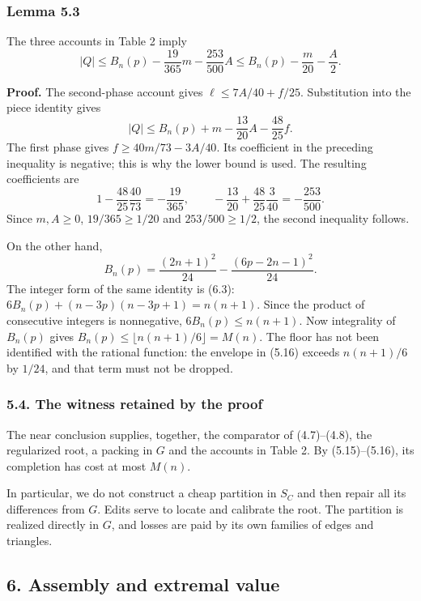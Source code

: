 \documentclass[english,11pt,a4paper]{article}
\begin{document}
\subsubsection{Lemma 5.3}\label{lemma-5.3}

The three accounts in Table 2 imply \[
|Q|\le B_n(p)-\frac{19}{365}m-\frac{253}{500}A
\le B_n(p)-\frac m{20}-\frac A2.
\tag{5.15}
\]

\textbf{Proof.} The second-phase account gives \(\ell\le7A/40+f/25\). Substitution into the piece identity gives \[
|Q|\le B_n(p)+m-\frac{13}{20}A-\frac{48}{25}f.
\] The first phase gives \(f\ge40m/73-3A/40\). Its coefficient in the preceding inequality is negative; this is why the lower bound is used. The resulting coefficients are \[
1-\frac{48}{25}\frac{40}{73}=-\frac{19}{365},\qquad
-\frac{13}{20}+\frac{48}{25}\frac3{40}=-\frac{253}{500}.
\] Since \(m,A\ge0\), \(19/365\ge1/20\) and \(253/500\ge1/2\), the second inequality follows.

On the other hand, \[
B_n(p)=\frac{(2n+1)^2}{24}-\frac{(6p-2n-1)^2}{24}.
\tag{5.16}
\] The integer form of the same identity is (6.3): \(6B_n(p)+(n-3p)(n-3p+1)=n(n+1)\). Since the product of consecutive integers is nonnegative, \(6B_n(p)\le n(n+1)\). Now integrality of \(B_n(p)\) gives \(B_n(p)\le\lfloor n(n+1)/6\rfloor=M(n)\). The floor has not been identified with the rational function: the envelope in (5.16) exceeds \(n(n+1)/6\) by \(1/24\), and that term must not be dropped.

\subsubsection{5.4. The witness retained by the proof}\label{the-witness-retained-by-the-proof}

The near conclusion supplies, together, the comparator of (4.7)--(4.8), the regularized root, a packing in \(G\) and the accounts in Table 2. By (5.15)--(5.16), its completion has cost at most \(M(n)\).

In particular, we do not construct a cheap partition in \(S_C\) and then repair all its differences from \(G\). Edits serve to locate and calibrate the root. The partition is realized directly in \(G\), and losses are paid by its own families of edges and triangles.

\subsection{6. Assembly and extremal value}\label{assembly-and-extremal-value}
\end{document}

